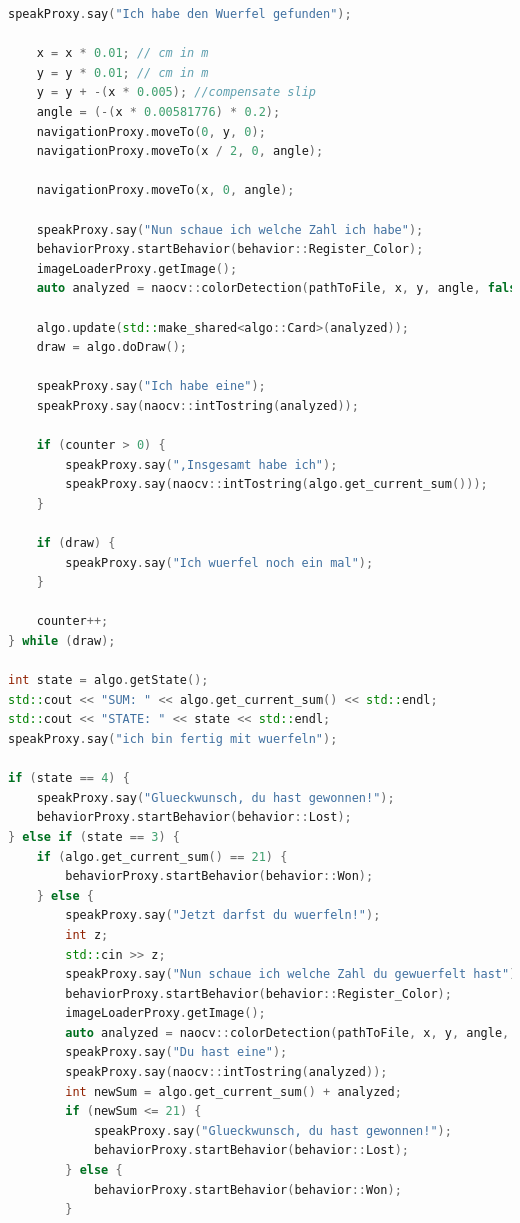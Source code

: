 \begin{appendix}
\begin{lstlisting}[language=c++,
                   caption={Mainloop},
                   label={lst:main1}]
    speakProxy.say("Ich habe den Wuerfel gefunden");

    x = x * 0.01; // cm in m
    y = y * 0.01; // cm in m
    y = y + -(x * 0.005); //compensate slip
    angle = (-(x * 0.00581776) * 0.2);
    navigationProxy.moveTo(0, y, 0);
    navigationProxy.moveTo(x / 2, 0, angle);

    navigationProxy.moveTo(x, 0, angle);

    speakProxy.say("Nun schaue ich welche Zahl ich habe");
    behaviorProxy.startBehavior(behavior::Register_Color);
    imageLoaderProxy.getImage();
    auto analyzed = naocv::colorDetection(pathToFile, x, y, angle, false);

    algo.update(std::make_shared<algo::Card>(analyzed));
    draw = algo.doDraw();

    speakProxy.say("Ich habe eine");
    speakProxy.say(naocv::intTostring(analyzed));

    if (counter > 0) {
        speakProxy.say(",Insgesamt habe ich");
        speakProxy.say(naocv::intTostring(algo.get_current_sum()));
    }

    if (draw) {
        speakProxy.say("Ich wuerfel noch ein mal");
    }

    counter++;
} while (draw);

int state = algo.getState();
std::cout << "SUM: " << algo.get_current_sum() << std::endl;
std::cout << "STATE: " << state << std::endl;
speakProxy.say("ich bin fertig mit wuerfeln");

if (state == 4) {
    speakProxy.say("Glueckwunsch, du hast gewonnen!");
    behaviorProxy.startBehavior(behavior::Lost);
} else if (state == 3) {
    if (algo.get_current_sum() == 21) {
        behaviorProxy.startBehavior(behavior::Won);
    } else {
        speakProxy.say("Jetzt darfst du wuerfeln!");
        int z;
        std::cin >> z;
        speakProxy.say("Nun schaue ich welche Zahl du gewuerfelt hast");
        behaviorProxy.startBehavior(behavior::Register_Color);
        imageLoaderProxy.getImage();
        auto analyzed = naocv::colorDetection(pathToFile, x, y, angle, false);
        speakProxy.say("Du hast eine");
        speakProxy.say(naocv::intTostring(analyzed));
        int newSum = algo.get_current_sum() + analyzed;
        if (newSum <= 21) {
            speakProxy.say("Glueckwunsch, du hast gewonnen!");
            behaviorProxy.startBehavior(behavior::Lost);
        } else {
            behaviorProxy.startBehavior(behavior::Won);
        }
\end{lstlisting}

\end{appendix}
